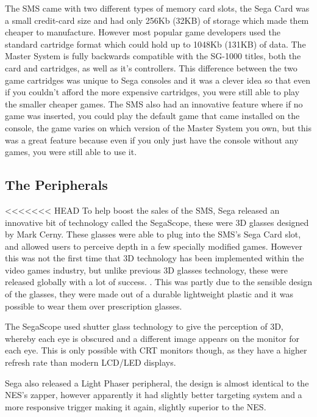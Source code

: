\documentclass{scrartcl}
\begin{document}
The SMS came with two different types of memory card slots, the Sega Card was a small credit-card size and had only 256Kb (32KB) of storage which made them cheaper to manufacture. However most popular game developers used the standard cartridge format which could hold up to 1048Kb (131KB) of data. \cite{Weiss2009} The Master System is fully backwards compatible with the SG-1000 titles, both the card and cartridges, as well as it's controllers. \cite{racket} This difference between the two game cartridges was unique to Sega consoles and it was a clever idea so that even if you couldn't afford the more expensive cartridges, you were still able to play the smaller cheaper games. The SMS also had an innovative feature where if no game was inserted, you could play the default game that came installed on the console, the game varies on which version of the Master System you own, but this was a great feature because even if you only just have the console without any games, you were still able to use it.


\subsection{The Peripherals}

<<<<<<< HEAD
To help boost the sales of the SMS, Sega released an innovative bit of technology called the SegaScope, these were 3D glasses designed by Mark Cerny. \cite{Kent2001}  These glasses were able to plug into the SMS's Sega Card slot, and allowed users to perceive depth in a few specially modified games. However this was not the first time that 3D technology has been implemented within the video games industry\cite{Edwards}, but unlike previous 3D glasses technology, these were released globally with a lot of success. \cite{Workman}. This was partly due to the sensible design of the glasses, they were made out of a durable lightweight plastic and it was possible to wear them over prescription glasses. \cite{Kent2001}

The SegaScope used shutter glass technology to give the perception of 3D, whereby each eye is obscured and a different image appears on the monitor for each eye. This is only possible with CRT monitors though, as they have a higher refresh rate than modern LCD/LED displays.\cite{Cohen}

Sega also released a Light Phaser peripheral, the design is almost identical to the NES's zapper, however apparently it had slightly better targeting system and a more responsive trigger making it again, slightly superior to the NES.\cite{Weiss2009}
\end{document}
